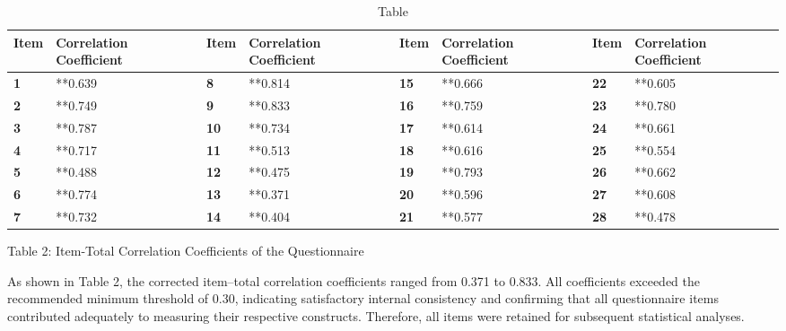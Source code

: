 \documentclass{NSP1}
\begin{document}
\begin{table}[tbp]
\centering
{\small
\begin{tabular}{|p{}|p{}|p{}|p{}|p{}|p{}|p{}|p{}|}
\hline
\cellcolor[HTML]{DDD9C3}\textbf{Item} & \cellcolor[HTML]{DDD9C3}\textbf{Correlation Coefficient} & \cellcolor[HTML]{DDD9C3}\textbf{Item} & \cellcolor[HTML]{DDD9C3}\textbf{Correlation Coefficient} & \cellcolor[HTML]{DDD9C3}\textbf{Item} & \cellcolor[HTML]{DDD9C3}\textbf{Correlation Coefficient} & \cellcolor[HTML]{DDD9C3}\textbf{Item} & \cellcolor[HTML]{DDD9C3}\textbf{Correlation Coefficient} \\
\hline
\cellcolor[HTML]{DDD9C3}\textbf{1} & **0.639 & \textbf{8} & **0.814 & \textbf{15} & **0.666 & \textbf{22} & **0.605 \\
\hline
\cellcolor[HTML]{DDD9C3}\textbf{2} & **0.749 & \textbf{9} & **0.833 & \textbf{16} & **0.759 & \textbf{23} & **0.780 \\
\hline
\cellcolor[HTML]{DDD9C3}\textbf{3} & **0.787 & \textbf{10} & **0.734 & \textbf{17} & **0.614 & \textbf{24} & **0.661 \\
\hline
\cellcolor[HTML]{DDD9C3}\textbf{4} & **0.717 & \textbf{11} & **0.513 & \textbf{18} & **0.616 & \textbf{25} & **0.554 \\
\hline
\cellcolor[HTML]{DDD9C3}\textbf{5} & **0.488 & \textbf{12} & **0.475 & \textbf{19} & **0.793 & \textbf{26} & **0.662 \\
\hline
\cellcolor[HTML]{DDD9C3}\textbf{6} & **0.774 & \textbf{13} & **0.371 & \textbf{20} & **0.596 & \textbf{27} & **0.608 \\
\hline
\cellcolor[HTML]{DDD9C3}\textbf{7} & **0.732 & \textbf{14} & **0.404 & \textbf{21} & **0.577 & \textbf{28} & **0.478 \\
\hline
\end{tabular}}
\caption{Table}

\end{table}

Table 2: Item-Total Correlation Coefficients of the Questionnaire

As shown in Table 2, the corrected item–total correlation coefficients ranged from 0.371 to 0.833. All coefficients exceeded the recommended minimum threshold of 0.30, indicating satisfactory internal consistency and confirming that all questionnaire items contributed adequately to measuring their respective constructs. Therefore, all items were retained for subsequent statistical analyses.
\end{document}
